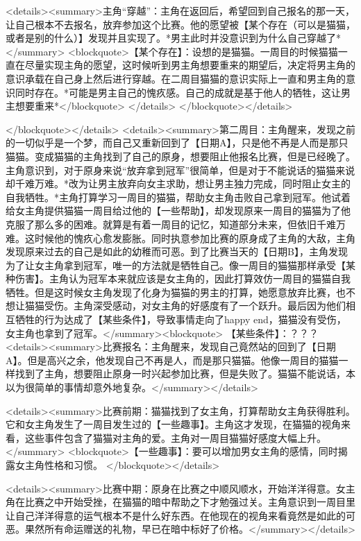 <details><summary>主角“穿越”：主角在返回后，希望回到自己报名的那一天，让自己根本不去报名，放弃参加这个比赛。他的愿望被【某个存在（可以是猫猫，或者是别的什么）】发现并且实现了。*男主此时并没意识到为什么自己穿越了*</summary>
<blockquote>【某个存在】：设想的是猫猫。一周目的时候猫猫一直在尽量实现主角的愿望，这时候听到男主角想要重来的期望后，决定将男主角的意识承载在自己身上然后进行穿越。在二周目猫猫的意识实际上一直和男主角的意识同时存在。*可能是男主自己的愧疚感。自己的成就是基于他人的牺牲，这让男主想要重来*</blockquote>
</details>
</blockquote></details>

</blockquote></details>
<details><summary>第二周目：主角醒来，发现之前的一切似乎是一个梦，而自己又重新回到了【日期A】，只是他不再是人而是那只猫猫。变成猫猫的主角找到了自己的原身，想要阻止他报名比赛，但是已经晚了。主角意识到，对于原身来说“放弃拿到冠军”很简单，但是对于不能说话的猫猫来说却千难万难。*改为让男主放弃向女主求助，想让男主独力完成，同时阻止女主的自我牺牲。*主角打算学习一周目的猫猫，帮助女主角击败自己拿到冠军。他试着给女主角提供猫猫一周目给过他的【一些帮助】，却发现原来一周目的猫猫为了他克服了那么多的困难。就算是有着一周目的记忆，知道部分未来，但依旧千难万难。这时候他的愧疚心愈发膨胀。同时执意参加比赛的原身成了主角的大敌，主角发现原来过去的自己是如此的幼稚而可恶。到了比赛当天的【日期B】，主角发现为了让女主角拿到冠军，唯一的方法就是牺牲自己。像一周目的猫猫那样承受【某种伤害】。主角认为冠军本来就应该是女主角的，因此打算效仿一周目的猫猫自我牺牲。但是这时候女主角发现了化身为猫猫的男主的打算，她愿意放弃比赛，也不想让猫猫受伤。主角深受感动，对女主角的好感度有了一个跃升。最后因为他们相互牺牲的行为达成了【某些条件】，导致事情走向了happy end，猫猫没有受伤，女主角也拿到了冠军。</summary><blockquote>
【某些条件】：？？？
<details><summary>比赛报名：主角醒来，发现自己竟然站的回到了【日期A】。但是高兴之余，他发现自己不再是人，而是那只猫猫。他像一周目的猫猫一样找到了主角，想要阻止原身一时兴起参加比赛，但是失败了。猫猫不能说话，本以为很简单的事情却意外地复杂。</summary></details>

<details><summary>比赛前期：猫猫找到了女主角，打算帮助女主角获得胜利。它和女主角发生了一周目发生过的【一些趣事】。主角这才发现，在猫猫的视角来看，这些事件包含了猫猫对主角的爱。主角对一周目猫猫好感度大幅上升。</summary>
<blockquote>【一些趣事】：要可以增加男女主角的感情，同时揭露女主角性格和习惯。
</blockquote></details>

<details><summary>比赛中期：原身在比赛之中顺风顺水，开始洋洋得意。女主角在比赛之中开始受挫，在猫猫的暗中帮助之下才勉强过关。主角意识到一周目里让自己洋洋得意的运气根本不是什么好东西。在他现在的视角来看竟然是如此的可恶。果然所有命运赠送的礼物，早已在暗中标好了价格。</summary></details>

